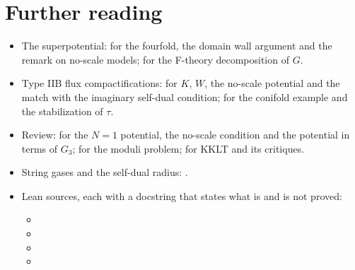 \section*{Further reading}
\begin{itemize}[leftmargin=*,itemsep=1pt]
\item The superpotential:  for the fourfold, the domain wall
 argument and the remark on no-scale models;  for the
 F-theory decomposition of $G$.
\item Type IIB flux compactifications:  for $K$, $W$, the
 no-scale potential and the match with the imaginary self-dual condition;
  for the conifold example and the stabilization of $\tau$.
\item Review:  for the
 $N=1$ potential, the no-scale condition and the potential in terms of $G_3$;
  for the moduli problem;  for KKLT and its critiques.
\item String gases and the self-dual radius: .
\item Lean sources, each with a docstring that states what is and is not proved:
 \begin{itemize}[leftmargin=*,itemsep=0pt]
 \item {}
 \item {}
 \item {}
 \item {}
 \end{itemize}
\end{itemize}
